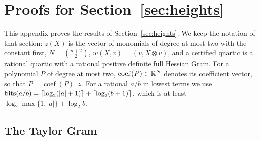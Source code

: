 \section{Proofs for Section~\ref{sec:heights}}
\label{app:heights}

This appendix proves the results of Section~\ref{sec:heights}. We keep the
notation of that section: $z(X)$ is the vector of monomials of degree at most
two with the constant first, $N=\binom{n+2}{2}$, $w(X,v)=(v,X\otimes v)$, and
a certified quartic is a rational quartic with a rational positive definite
full Hessian Gram. For a polynomial $P$ of degree at most two,
$\operatorname{coef}(P)\in\mathbb R^N$ denotes its coefficient vector, so that
$P=\operatorname{coef}(P)^{\mathsf T}z$. For a rational $a/b$ in lowest terms
we use $\operatorname{bits}(a/b)=\lceil\log_2(|a|+1)\rceil+\lceil\log_2(b+1)\rceil$, which is
at least $\log_2\max\{1,|a|\}+\log_2b$.

\subsection{The Taylor Gram}
\label{app:heights-taylor}

